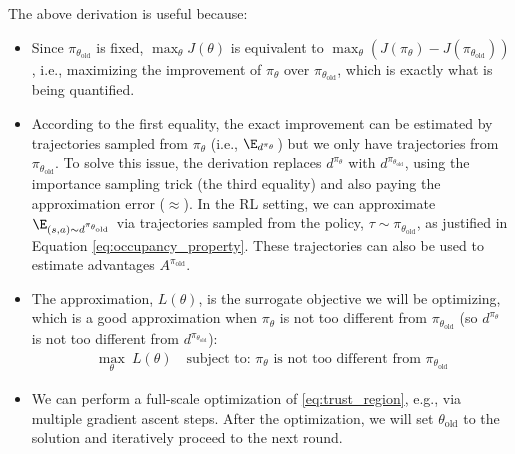 The above derivation is useful because:
\begin{itemize}
    \item Since $\pi_{\theta_{\text{old}}}$ is fixed, $\max_\theta J(\theta)$ is equivalent to $\max_\theta (J(\pi_\theta)-J(\pi_{\theta_{\text{old}}}))$, i.e., maximizing the improvement of $\pi_\theta$ over $\pi_{\theta_{\text{old}}}$, which is exactly what is being quantified.
    \item According to the first equality, the exact improvement can be estimated by trajectories sampled from $\pi_\theta$ (i.e., $\E_{d^{\pi_\theta}}$) but we only have trajectories from $\pi_{\theta_{\text{old}}}$.
    To solve this issue, the derivation replaces $d^{\pi_\theta}$ with $d^{\pi_{\theta_{\text{old}}}}$, using the importance sampling trick (the third equality) and also paying the approximation error ($\approx$).
    In the RL setting, we can approximate $\E_{(s,a)\sim d^{\pi_{\theta_{\text{old}}}}}$ via trajectories sampled from the policy, $\tau\sim\pi_{\theta_{\text{old}}}$, as justified in Equation \eqref{eq:occupancy_property}.
    These trajectories can also be used to estimate advantages $A^{\pi_{\text{old}}}$.
    \item  The approximation, $L(\theta)$, is the surrogate objective we will be optimizing, which is a good approximation when $\pi_{\theta}$ is not too different from $\pi_{\theta_{\text{old}}}$ (so $d^{\pi_{\theta}}$ is not too different from $d^{\pi_{\theta_{\text{old}}}}$):
    \begin{align}
    \label{eq:trust_region}
        \max_{\theta}~ L(\theta)\quad \text{subject to: $\pi_{\theta}$ is not too different from $\pi_{\theta_{\text{old}}}$}
    \end{align}

    \item We can perform a full-scale optimization of \eqref{eq:trust_region}, e.g., via multiple gradient ascent steps. After the optimization, we will set $\theta_{\text{old}}$ to the solution and iteratively proceed to the next round.
\end{itemize}

